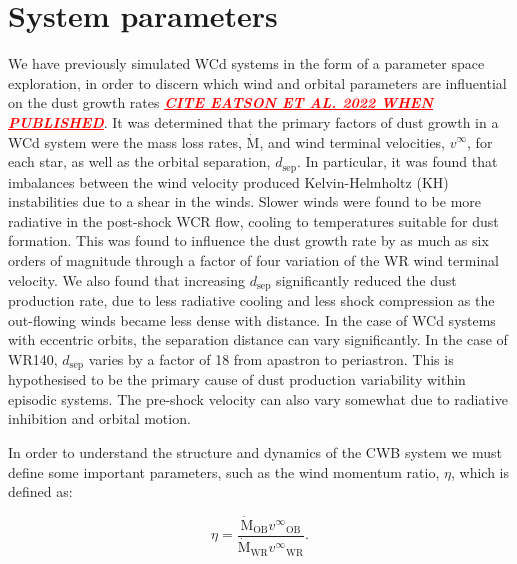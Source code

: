 \documentclass[fleqn,usenatbib]{mnras}
\newcommand{\swr}{\ensuremath{_{\text{WR}}}}
\newcommand{\sob}{\ensuremath{_{\text{OB}}}}
\newcommand{\rms}[1]{\ensuremath{_{\text{#1}}}}
\newcommand{\mdot}{\dot{\text{M}}}
\newcommand{\dsep}{d\rms{sep}}
\begin{document}
\section{System parameters}
\label{sec:paper2-wr140}

We have previously simulated WCd systems in the form of a parameter space exploration, in order to discern which wind and orbital parameters are influential on the dust growth rates \textcolor{red}{\underline{\emph{\textbf{CITE EATSON ET AL. 2022 WHEN PUBLISHED}}}}.
It was determined that the primary factors of dust growth in a WCd system were the mass loss rates, $\mdot$, and wind terminal velocities, $v^\infty$, for each star, as well as the orbital separation, $d\rms{sep}$.
In particular, it was found that imbalances between the wind velocity produced Kelvin-Helmholtz (KH) instabilities due to a shear in the winds.
Slower winds were found to be more radiative in the post-shock WCR flow, cooling to temperatures suitable for dust formation.
This was found to influence the dust growth rate by as much as six orders of magnitude through a factor of four variation of the WR wind terminal velocity.
We also found that increasing $d\rms{sep}$ significantly reduced the dust production rate, due to less radiative cooling and less shock compression as the out-flowing winds became less dense with distance.
In the case of WCd systems with eccentric orbits, the separation distance can vary significantly.
In the case of WR140, $\dsep$ varies by a factor of 18 from apastron to periastron.
This is hypothesised to be the primary cause of dust production variability within episodic systems.
The pre-shock velocity can also vary somewhat due to radiative inhibition and orbital motion.

In order to understand the structure and dynamics of the CWB system we must define some important parameters, such as the wind momentum ratio, $\eta$, which is defined as:

\begin{equation}
  \eta = \frac{\mdot\sob v^\infty\sob}{\mdot\swr v^\infty\swr} .
\end{equation}
\end{document}

